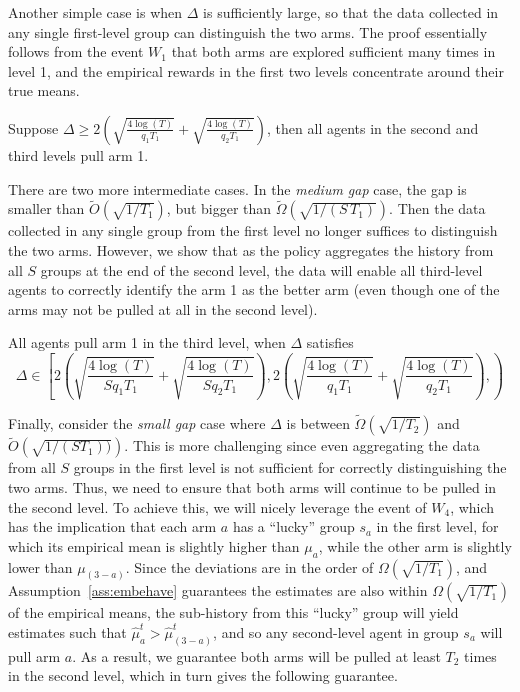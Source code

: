 Another simple case is when $\Delta$ is sufficiently large, so that
the data collected in any single first-level group can distinguish the
two arms. The proof essentially follows from the event $W_1$
that both arms are explored sufficient many times in level 1, and the
empirical rewards in the first two levels concentrate around their
true means.

\begin{lemma}\label{3levelbigcase}
  Suppose
  $\Delta \geq 2\left(\sqrt{\frac{4\log(T)}{q_1T_1}} +
    \sqrt{\frac{4\log(T)}{q_2T_1}}\right)$, then all agents in the
  second and third levels pull arm 1.
\end{lemma}


There are two more intermediate cases. In the \emph{medium gap} case,
the gap is smaller than $\tilde O(\sqrt{1/T_1})$, but bigger than
$\tilde \Omega(\sqrt{1/(S\, T_1)})$. Then the data collected in any
single group from the first level no longer suffices to distinguish
the two arms. However, we show that as the policy aggregates the
history from all $S$ groups at the end of the second level, the data
will enable all third-level agents to correctly identify the arm 1 as
the better arm (even though one of the arms may not be pulled at all
in the second level).

\begin{lemma}\label{3levelmedium}
  All agents pull arm 1 in the third level, when $\Delta$ satisfies
  \[
  \Delta\in \left[
   2\left(\sqrt{\frac{4\log(T)}{Sq_1T_1}} +
    \sqrt{\frac{4\log(T)}{Sq_2T_1}}\right),
 2\left(\sqrt{\frac{4\log(T)}{q_1T_1}} +
        \sqrt{\frac{4\log(T)}{q_2T_1}}\right), 
    \right)
  \]
\end{lemma}


Finally, consider the \emph{small gap} case where $\Delta$ is between
$\tilde\Omega(\sqrt{1/T_2})$ and $\tilde O(\sqrt{1/(S T_1))})$. This
is more challenging since even aggregating the data from all $S$
groups in the first level is not sufficient for correctly
distinguishing the two arms. Thus, we need to ensure that both arms
will continue to be pulled in the second level. To achieve this, we
will nicely leverage the event of $W_4$, which has the implication
that each arm $a$ has a ``lucky'' group $s_a$ in the first level,
for which its empirical mean is slightly higher than $\mu_a$, while
the other arm is slightly lower than $\mu_{(3-a)}$. Since the
deviations are in the order of $\Omega(\sqrt{1/T_1})$, and Assumption~\ref{ass:embehave} guarantees the estimates are also within $\Omega(\sqrt{1/T_1})$ of the empirical means, the sub-history
from this ``lucky'' group will yield estimates such that
$\hat \mu_a^t > \hat \mu_{(3-a)}^t$, and so any second-level agent in
group $s_a$ will pull arm $a$.  As a result, we guarantee both arms
will be pulled at least $T_2$ times in the second level, which in turn
gives the following guarantee.


